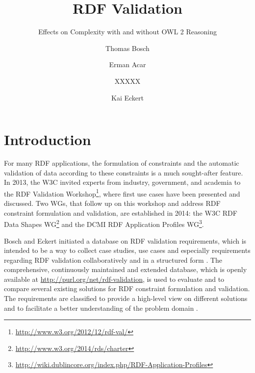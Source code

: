 \documentclass{llncs}
\begin{document}
%
%
\title{RDF Validation}
\subtitle{Effects on Complexity with and without OWL 2 Reasoning}
%
%
\author{Thomas Bosch \and Erman Acar \and XXXXX \and Kai Eckert}
%
%

\maketitle              %

\begin{abstract}


\end{abstract}
%

\section{Introduction}

For many RDF applications, the formulation of constraints and the automatic validation of data according to these constraints is a much sought-after feature. 
In 2013, the W3C invited experts from industry, government, and academia to the RDF Validation Workshop\footnote{\url{http://www.w3.org/2012/12/rdf-val/}}, 
where first use cases have been presented and discussed. 
Two WGs, that follow up on this workshop and address RDF constraint formulation and validation, are established in 2014: 
the W3C RDF Data Shapes WG\footnote{\url{http://www.w3.org/2014/rds/charter}} and the DCMI RDF Application Profiles WG\footnote{\url{http://wiki.dublincore.org/index.php/RDF-Application-Profiles}}. 

Bosch and Eckert \cite{BoschEckert2014} initiated a database on RDF validation requirements, which is intended to be a way to collect case studies, use cases and especially requirements regarding RDF validation collaboratively and in a structured form \cite{DroegeBoschCharlesClayphanMatienzoRuehlePohlAlonenSvenssonCoyle2014}.
The comprehensive, continuously maintained and extended database, which is openly available at \url{http://purl.org/net/rdf-validation}, is used to evaluate and to compare several existing solutions for RDF constraint formulation and validation. 
The requirements are classified to provide a high-level view on different solutions and to facilitate a better understanding of the problem domain \cite{BoschEckert2014}.  
\end{document}

